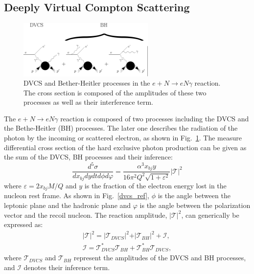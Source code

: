 \subsection {Deeply Virtual Compton Scattering}
\begin{figure}[!ht]
 \begin{center}
  \includegraphics[width=0.6\textwidth]{./figures/bh.pdf}
   \caption[DVCS and Bether-Heitler processes in the $e+N\rightarrow eN\gamma$ reaction]{\footnotesize{DVCS and Bether-Heitler processes in the $e+N\rightarrow eN\gamma$ reaction. The cross section is composed of the amplitudes of these two processes as well as their interference term.}}
  \label{dvcs_bh}
 \end{center}
\end{figure}
The $e+N\rightarrow eN\gamma$ reaction is composed of two processes including the DVCS and the Bethe-Heitler (BH) processes. The later one describes the radiation of the photon by the incoming or scattered electron, as shown in Fig.~\ref{dvcs_bh}. The measure differential cross section of the hard exclusive photon production can be given as the sum of the DVCS, BH processes and their inference:
 \begin{equation}
   \frac{d^{5}\sigma}{dx_{bj}dydtd\phi d\varphi}=\frac{\alpha^{3}x_{bj}y}{16\pi^{2}Q^{2}\sqrt{1+\varepsilon^{2}}}\vert \mathcal{T} \vert^{2}
 \end{equation}
where $\varepsilon=2x_{bj}M/Q$ and $y$ is the fraction of the electron energy lost in the nucleon rest frame. As shown in Fig.~\ref{dvcs_ref}, $\phi$ is the angle between the leptonic plane and the hadronic plane and $\varphi$ is the angle between the polarization vector and the recoil nucleon. The reaction amplitude, $\vert\mathcal{T}\vert^{2}$, can generically be expressed as:
\begin{eqnarray}
 \vert \mathcal{T}\vert^2  = \vert \mathcal{T}_{DVCS}\vert^2 + \vert \mathcal{T}_{BH}\vert^2+ \mathcal{I}, \label{eq:dvcs_amp}\\
\mathcal{I} = \mathcal{T}_{DVCS}^{*}\mathcal{T}_{BH} + \mathcal{T}_{BH}^{*}\mathcal{T}_{DVCS},
\end{eqnarray}
where $\mathcal{T}_{DVCS}$ and $\mathcal{T}_{BH}$ represent the amplitudes of the DVCS and BH processes, and $\mathcal{I}$ denotes their inference term. 
